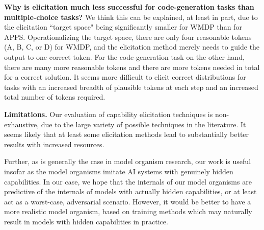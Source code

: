 \textbf{Why is elicitation much less successful for code-generation tasks than multiple-choice tasks?} We think this can be explained, at least in part, due to the elicitation ``target space" being significantly smaller for WMDP than for APPS. Operationalizing the target space, there are only four reasonable tokens (A, B, C, or D) for WMDP, and the elicitation method merely needs to guide the output to one correct token. For the code-generation task on the other hand, there are many more reasonable tokens and there are more tokens needed in total for a correct solution. It seems more difficult to elicit correct distributions for tasks with an increased breadth of plausible tokens at each step and an increased total number of tokens required.

\textbf{Limitations.} Our evaluation of capability elicitation techniques is non-exhaustive, due to the large variety of possible techniques in the literature. %
It seems likely that at least some elicitation methods lead to substantially better results with increased resources.


Further, as is generally the case in model organism research, our work is useful insofar as the model organisms imitate AI systems with genuinely hidden capabilities. In our case, we hope that the internals of our model organisms are predictive of the internals of models with actually hidden capabilities, or at least act as a worst-case, adversarial scenario. However, it would be better to have a more realistic model organism, based on training methods which may naturally result in models with hidden capabilities in practice.  %
